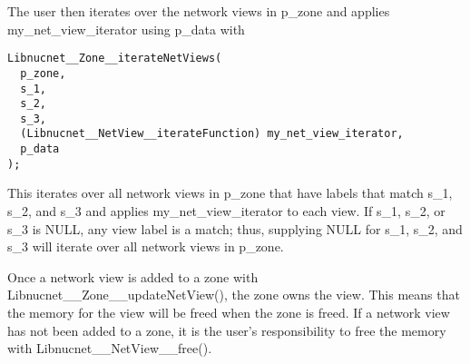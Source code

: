 \documentclass{article}    %
\begin{document}
The user then iterates over the network views in p\_zone and
applies my\_net\_view\_iterator using p\_data with
\begin{verbatim}
Libnucnet__Zone__iterateNetViews(
  p_zone,
  s_1,
  s_2,
  s_3,
  (Libnucnet__NetView__iterateFunction) my_net_view_iterator,
  p_data
);
\end{verbatim}
This iterates over all network views in p\_zone that have labels
that match s\_1, s\_2, and s\_3 and applies my\_net\_view\_iterator
to each view.  If s\_1, s\_2, or s\_3 is NULL, any view label is a match;
thus, supplying NULL for s\_1, s\_2, and s\_3 will iterate over all
network views in p\_zone.

Once a network view is added to a zone with
Libnucnet\_\_Zone\_\_updateNetView(), the zone owns the view.  This
means that the memory for the view will be freed when the zone is freed.
If a network view has not been added to a zone, it is the user's
responsibility to free the memory with Libnucnet\_\_NetView\_\_free().
\end{document}
